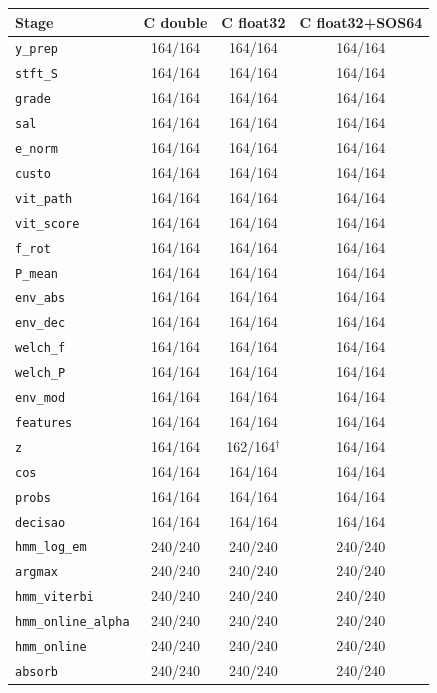 \begin{tabular}{lccc}
\toprule
Stage & C double & C float32 & C float32+SOS64 \\
\midrule
\texttt{y\_prep} & 164/164 & 164/164 & 164/164 \\
\texttt{stft\_S} & 164/164 & 164/164 & 164/164 \\
\texttt{grade} & 164/164 & 164/164 & 164/164 \\
\texttt{sal} & 164/164 & 164/164 & 164/164 \\
\texttt{e\_norm} & 164/164 & 164/164 & 164/164 \\
\texttt{custo} & 164/164 & 164/164 & 164/164 \\
\texttt{vit\_path} & 164/164 & 164/164 & 164/164 \\
\texttt{vit\_score} & 164/164 & 164/164 & 164/164 \\
\texttt{f\_rot} & 164/164 & 164/164 & 164/164 \\
\texttt{P\_mean} & 164/164 & 164/164 & 164/164 \\
\texttt{env\_abs} & 164/164 & 164/164 & 164/164 \\
\texttt{env\_dec} & 164/164 & 164/164 & 164/164 \\
\texttt{welch\_f} & 164/164 & 164/164 & 164/164 \\
\texttt{welch\_P} & 164/164 & 164/164 & 164/164 \\
\texttt{env\_mod} & 164/164 & 164/164 & 164/164 \\
\texttt{features} & 164/164 & 164/164 & 164/164 \\
\texttt{z} & 164/164 & 162/164$^\dagger$ & 164/164 \\
\texttt{cos} & 164/164 & 164/164 & 164/164 \\
\texttt{probs} & 164/164 & 164/164 & 164/164 \\
\texttt{decisao} & 164/164 & 164/164 & 164/164 \\
\texttt{hmm\_log\_em} & 240/240 & 240/240 & 240/240 \\
\texttt{argmax} & 240/240 & 240/240 & 240/240 \\
\texttt{hmm\_viterbi} & 240/240 & 240/240 & 240/240 \\
\texttt{hmm\_online\_alpha} & 240/240 & 240/240 & 240/240 \\
\texttt{hmm\_online} & 240/240 & 240/240 & 240/240 \\
\texttt{absorb} & 240/240 & 240/240 & 240/240 \\
\bottomrule
\end{tabular}

